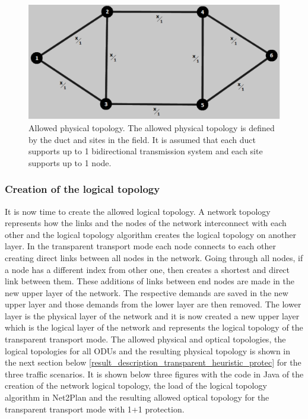 \begin{figure}[H]
\centering
\includegraphics[width=12cm]{sdf/heuristic/transparent_protection/figures/allowed_physical}
\caption{Allowed physical topology. The allowed physical topology is defined by the duct and sites in the field. It is assumed that each duct supports up to 1 bidirectional transmission system and each site supports up to 1 node.}
\label{allowed_physical_protec}
\end{figure}

\subsubsection{Creation of the logical topology}

\vspace{11pt}
It is now time to create the allowed logical topology. A network topology represents how the links and the nodes of the network interconnect with each other and the logical topology algorithm creates the logical topology on another layer. In the transparent transport mode each node connects to each other creating direct links between all nodes in the network. Going through all nodes, if a node has a different index from other one, then creates a shortest and direct link between them. These additions of links between end nodes are made in the new upper layer of the network. The respective demands are saved in the new upper layer and those demands from the lower layer are then removed. The lower layer is the physical layer of the network and it is now created a new upper layer which is the logical layer of the network and represents the logical topology of the transparent transport mode.
The allowed physical and optical topologies, the logical topologies for all ODUs and the resulting physical topology is shown in the next section below \ref{result_description_transparent_heuristic_protec} for the three traffic scenarios. It is shown below three figures with the code in Java of the creation of the network logical topology, the load of the logical topology algorithm in Net2Plan and the resulting allowed optical topology for the transparent transport mode with 1+1 protection.


